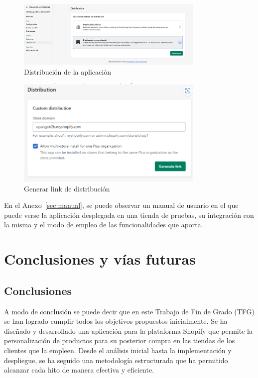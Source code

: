 \documentclass[12pt]{article}
\begin{document}
\begin{figure}[ht]
    \centering
    \includegraphics[width=0.8\textwidth]{imagenes/distribucionAppEnlace.png}
    \caption{\label{fig:DistributionAppPartners}Distribución de la aplicación}
    \vspace{\fill}
\end{figure}

\begin{figure}[ht]
    \centering
    \includegraphics[width=0.8\textwidth]{imagenes/generarLinkDistribution.png}
    \caption{\label{fig:generarLinkDistribution}Generar link de distribución}
    \vspace{\fill}
\end{figure}

En el Anexo~\ref{sec:manual}, se puede observar un manual de usuario en el que puede verse la aplicación desplegada en una tienda de pruebas, su integración
con la misma y el modo de empleo de las funcionalidades que aporta.

\clearpage
\section{Conclusiones y vías futuras}

\subsection{Conclusiones}
A modo de conclusión se puede decir que en este Trabajo de Fin de Grado (TFG) se han logrado cumplir todos
los objetivos propuestos inicialmente. Se ha diseñado y desarrollado una aplicación para la plataforma Shopify que 
permite la personalización de productos para su posterior compra en las tiendas de los clientes que la empleen.
Desde el análisis inicial hasta la implementación y despliegue, se ha seguido una metodología estructurada que ha permitido
alcanzar cada hito de manera efectiva y eficiente.
\end{document}
